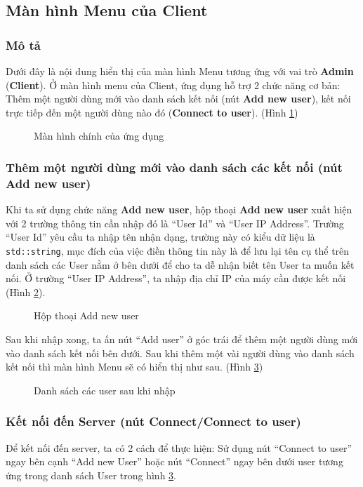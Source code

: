 \subsection{Màn hình Menu của Client}
\subsubsection{Mô tả}
Dưới đây là nội dung hiển thị của màn hình Menu tương ứng với vai trò \textbf{Admin} (\textbf{Client}). Ở màn hình menu của Client, ứng dụng hỗ trợ 2 chức năng cơ bản: Thêm một người dùng mới vào danh sách kết nối (nút \textbf{Add new user}), kết nối trực tiếp đến một người dùng nào đó (\textbf{Connect to user}). (Hình \ref{fig:ClientMenuWindow})
\begin{figure}[H]
	\caption{Màn hình chính của ứng dụng}
	\label{fig:ClientMenuWindow}
\end{figure}
\subsubsection{Thêm một người dùng mới vào danh sách các kết nối (nút Add new user)}
Khi ta sử dụng chức năng \textbf{Add new user}, hộp thoại \textbf{Add new user} xuất hiện với 2 trường thông tin cần nhập đó là ``User Id'' và ``User IP Address''. Trường ``User Id'' yêu cầu ta nhập tên nhận dạng, trường này có kiểu dữ liệu là \verb|std::string|, mục đích của việc điền thông tin này là để lưu lại tên cụ thể trên danh sách các User nằm ở bên dưới để cho ta dễ nhận biết tên User ta muốn kết nối. Ở trường ``User IP Address'', ta nhập địa chỉ IP của máy cần được kết nối (Hình \ref{fig:AddNewUserBox}). 

\begin{figure}[H]
	\caption{Hộp thoại Add new user}
	\label{fig:AddNewUserBox}
\end{figure}

Sau khi nhập xong, ta ấn nút ``Add user'' ở góc trái để thêm một người dùng mới vào danh sách kết nối bên dưới. Sau khi thêm một vài người dùng vào danh sách kết nối thì màn hình Menu sẽ có hiển thị như sau. (Hình \ref{fig:UserList})

\begin{figure}[H]
	\caption{Danh sách các user sau khi nhập}
	\label{fig:UserList}
\end{figure}

\subsubsection{Kết nối đến Server (nút Connect/Connect to user)}
Để kết nối đến server, ta có 2 cách để thực hiện: Sử dụng nút ``Connect to user'' ngay bên cạnh ``Add new User'' hoặc nút ``Connect'' ngay bên dưới user tương ứng trong danh sách User trong hình \ref{fig:UserList}.

